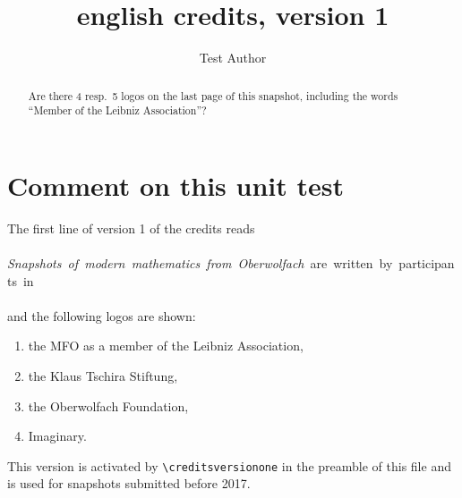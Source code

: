 \documentclass{snapshotmfo}
\author{Test Author}
\title{english credits, version 1}
\begin{document}
\begin{abstract}
Are there 4 resp.\ 5 logos on the last page of this snapshot, including the words ``Member of the Leibniz Association''?
\end{abstract}

\section{Comment on this unit test}
The first line of version 1 of the credits reads\\
\\
\hbox{\emph{Snapshots of modern mathematics from Oberwolfach} are written by participants in}\\
\\
and the following logos are shown:
\begin{enumerate}
  \item the MFO as a member of the Leibniz Association,
  \item the Klaus Tschira Stiftung,
  \item the Oberwolfach Foundation,
  \item Imaginary.
\end{enumerate}
This version is activated by \verb+\creditsversionone+ in the preamble of this file
and is used for snapshots submitted before 2017.
\end{document}
